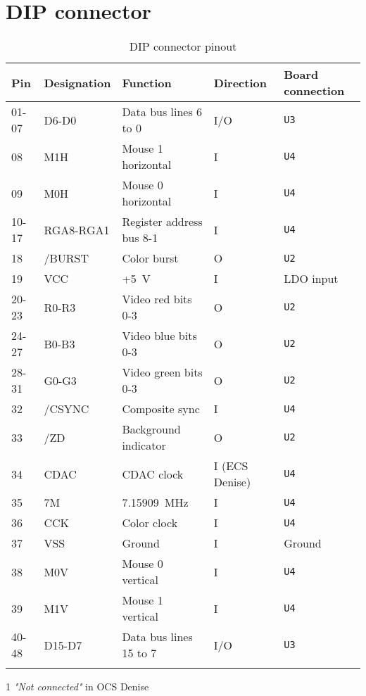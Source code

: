 \documentclass[10pt]{datasheet}
\begin{document}
\clearpage
\section{DIP connector}
\begin{table}[H]
\begin{threeparttable}
\caption{DIP connector pinout}
\begin{tabularx}{\textwidth}{ l l l l l }
  \thickhline
  \textbf{Pin} & \textbf{Designation} & \textbf{Function} & \textbf{Direction} & \textbf{Board connection}\\
  \hline
  01-07   & D6-D0         & Data bus lines 6 to 0     & I/O & \texttt{U3} \\
  08      & M1H           & Mouse 1 horizontal        & I & \texttt{U4} \\
  09      & M0H           & Mouse 0 horizontal        & I & \texttt{U4} \\
  10-17   & RGA8-RGA1     & Register address bus 8-1  & I & \texttt{U4} \\
  18      & /BURST        & Color burst               & O & \texttt{U2} \\
  19      & VCC           & +\SI{5}{V}                & I & LDO input \\
  20-23   & R0-R3         & Video red bits 0-3        & O & \texttt{U2} \\
  24-27   & B0-B3         & Video blue bits 0-3       & O & \texttt{U2} \\
  28-31   & G0-G3         & Video green bits 0-3      & O & \texttt{U2} \\
  32      & /CSYNC        & Composite sync            & I & \texttt{U4} \\
  33      & /ZD           & Background indicator      & O & \texttt{U2} \\
  34      & CDAC\tnote{1} & CDAC clock                & I (ECS Denise) & \texttt{U4} \\
  35      & 7M            & \SI{7.15909}{MHz}         & I & \texttt{U4} \\
  36      & CCK           & Color clock               & I & \texttt{U4} \\
  37      & VSS           & Ground                    & I & Ground \\
  38      & M0V           & Mouse 0 vertical          & I & \texttt{U4} \\
  39      & M1V           & Mouse 1 vertical          & I & \texttt{U4} \\
  40-48   & D15-D7        & Data bus lines 15 to 7    & I/O & \texttt{U3} \\
  \thickhline
\end{tabularx}
\begin{tablenotes}
\item[1]{\textit{"Not connected"} in OCS Denise}
\end{tablenotes}
\end{threeparttable}
\end{table}
\end{document}
